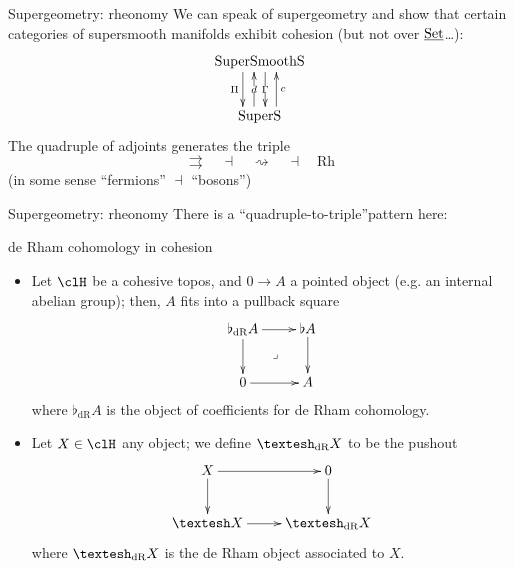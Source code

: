 \documentclass[presentation]{beamer}
\begin{document}
\begin{frame}{Supergeometry: rheonomy}
  We can speak of \alert{supergeometry} and show that certain categories of supersmooth manifolds exhibit cohesion (but not over $\underline{\text{Set}}$\dots):
  \[
  \xymatrix{
  \text{SuperSmoothS}
  \ar@<12pt>@{<-}[d]^c
  \ar@<-4pt>@{<-}[d]|d
  \ar@<4pt>[d]|\Gamma
  \ar@<-12pt>[d]_\Pi\\
  \text{SuperS}
  }
  \]
  The quadruple of adjoints generates the triple
  \[\rightrightarrows
  \quad \dashv \quad
  \rightsquigarrow
  \quad \dashv \quad
  \textrm{Rh}\]
  (in some sense ``fermions'' $\dashv$ ``bosons'')
\end{frame}
%
%
%
%
%
%
%
\begin{frame}{Supergeometry: rheonomy}
  There is a ``quadruple-to-triple''pattern here:
  \def\fisrt{\text{cohesion}}
  \def\secnod{\text{elasticity}}
  \def\trhid{\text{solidity}}
  \begin{center}
  \end{center}
\end{frame}
%
%
%
%
%
%
%
\begin{frame}[label={sec:orgf9c79a3}]{de Rham cohomology in cohesion}
  \begin{itemize}
    \item Let $\clH$ be a cohesive topos, and $0\to A$ a pointed object (e.g. an internal abelian group); then, $A$ fits into a pullback square 
    \[\xymatrix{\flat_\text{dR}A\ar[r]\ar[d]\ar@{}[dr]|\lrcorner & \flat A \ar[d]\\ 
    0 \ar[r] & A }\]
    where $\flat_\text{dR}A$ is the \alert{object of coefficients} for de Rham cohomology.
    \item Let $X\in\clH$ any object; we define $\shape_\text{dR}X$ to be the pushout
    \[\xymatrix{
    X \ar[r]\ar[d]& 0\ar[d] \\
    \shape X \ar[r] & \shape_\text{dR}X
    }\]
    where $\shape_\text{dR}X$ is the \alert{de Rham object} associated to $X$.
  \end{itemize}
\end{frame}
\end{document}
